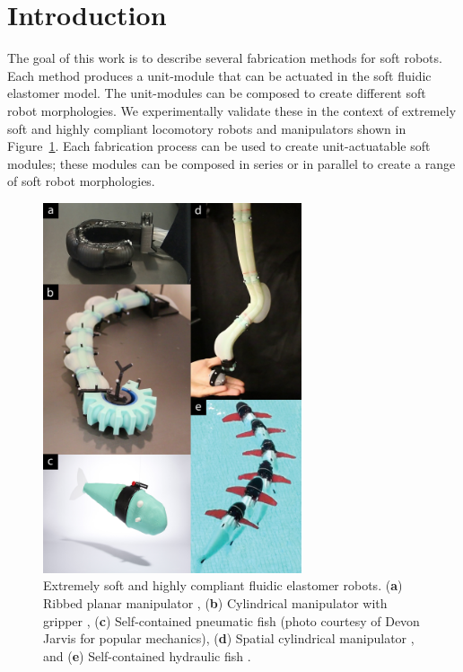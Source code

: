 
\section{Introduction}
\label{sec:Introduction}

The goal of this work is to describe several fabrication methods for soft robots. Each method produces a unit-module that can be actuated in the soft fluidic elastomer model. The unit-modules can be composed to create different soft robot morphologies.
%
We experimentally validate these in the context of extremely soft and highly compliant locomotory robots and manipulators shown in Figure~\ref{fig:intro_new}.
Each fabrication process can be used to create unit-actuatable soft modules; these modules can be composed in series or in parallel to create a range of soft robot morphologies.
\begin{figure}[!t]
  \centering
  \includegraphics[width=3in]{figures/introduction/intronew_v2.jpg}
  \caption{Extremely soft and highly compliant fluidic elastomer robots. (\textbf{a}) Ribbed planar manipulator \citep{marchese2014design}, (\textbf{b}) Cylindrical manipulator with gripper \citep{katzschmann2015autonomous}, (\textbf{c}) Self-contained pneumatic fish \citep{marchese2014autonomous}(photo courtesy of Devon Jarvis for popular mechanics), (\textbf{d}) Spatial cylindrical manipulator \citep{marchese2015design}, and (\textbf{e}) Self-contained hydraulic fish \citep{katzschmann2014hydraulic}. }\label{fig:intro_new}
\end{figure}

